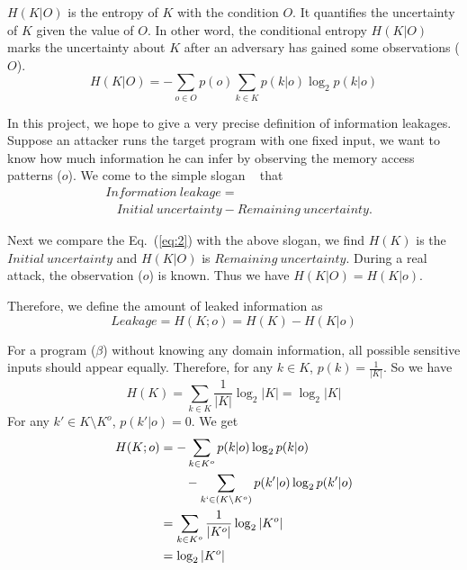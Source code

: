 $H(K|O)$ is the entropy of $K$ with the condition $O$. It quantifies the
uncertainty of $K$ given the value of $O$. In other word, the conditional
entropy $H(K|O)$ marks the uncertainty about $K$ after an adversary has gained
some observations ($O$).
\begin{equation}
    H(K|O) = - \sum_{o {\in} O} {p(o) \sum_{k {\in} K}{p(k|o)\log_2p(k|o)}}
\end{equation}

In this project, we hope to give a very precise definition of information
leakages. Suppose an attacker runs the target program with one
fixed input, we want to know how much information he can infer by observing the
memory access patterns ($o$). We come to the simple slogan
~\cite{10.1007/978-3-642-00596-1_21} %
that
\begin{align*}
     & \mathit{Information\ leakage} =                                       \\
     & ~~~~ \mathit{Initial\ uncertainty} - \mathit{Remaining\ uncertainty}.
\end{align*}

Next we compare the Eq.~(\ref{eq:2}) with the above slogan, we find $H(K)$
is the $\mathit{Initial\ uncertainty}$ and $H(K|O)$ is $\mathit{Remaining\
        uncertainty}$. During a real attack, the observation ($o$) is known.  Thus we
have $H(K|O) = H(K|o)$.

Therefore, we define the amount of leaked information as
\begin{displaymath}
    Leakage = H(K;o) = H(K) - H(K|o)
\end{displaymath}

For a program ($\beta$) without knowing any domain information, all possible sensitive
inputs should appear equally. Therefore, for any $k \in K$, $p(k) =
    \frac{1}{|K|}$. So we have
$$H(K) = \sum_{k {\in} K}\frac{1}{|K|}\log_2{|K|} = \log_2{|K|}$$
For any $k' \in K \setminus K^o$, $p(k'|o) = 0$. We get
\begin{align*}
    H(K;o) & = - \sum_{k {\in} K^o}{p(k|o)\log_2p(k|o)}                         \\
           & \qquad   - \sum_{k` {\in} (K \setminus K^o)}{p(k'|o)\log_2p(k'|o)} \\
           & = \sum_{k {\in} K^o}\frac{1}{|K^o|}\log_2{|K^o|}                   \\
           & = \log_2{|K^o|}
\end{align*}


